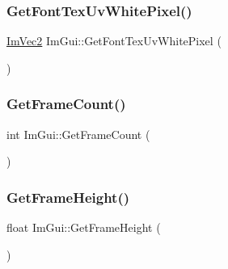 \hypertarget{namespace_im_gui_a3092da6abc1d04f3287c084435dc6026}{}\label{namespace_im_gui_a3092da6abc1d04f3287c084435dc6026} 
\subsubsection{\texorpdfstring{Get\+Font\+Tex\+Uv\+White\+Pixel()}{GetFontTexUvWhitePixel()}}
{\footnotesize\ttfamily \hyperlink{struct_im_vec2}{Im\+Vec2} Im\+Gui\+::\+Get\+Font\+Tex\+Uv\+White\+Pixel (\begin{DoxyParamCaption}{ }\end{DoxyParamCaption})}

\hypertarget{namespace_im_gui_a0180211f23fc10807dfc3d2f6e8681f9}{}\label{namespace_im_gui_a0180211f23fc10807dfc3d2f6e8681f9} 
\subsubsection{\texorpdfstring{Get\+Frame\+Count()}{GetFrameCount()}}
{\footnotesize\ttfamily int Im\+Gui\+::\+Get\+Frame\+Count (\begin{DoxyParamCaption}{ }\end{DoxyParamCaption})}

\hypertarget{namespace_im_gui_ae560f17cf3262017cee888d1eb77f294}{}\label{namespace_im_gui_ae560f17cf3262017cee888d1eb77f294} 
\subsubsection{\texorpdfstring{Get\+Frame\+Height()}{GetFrameHeight()}}
{\footnotesize\ttfamily float Im\+Gui\+::\+Get\+Frame\+Height (\begin{DoxyParamCaption}{ }\end{DoxyParamCaption})}

\hypertarget{namespace_im_gui_a8de260eebd333718fa0c3b6c80258c67}{}\label{namespace_im_gui_a8de260eebd333718fa0c3b6c80258c67} 
